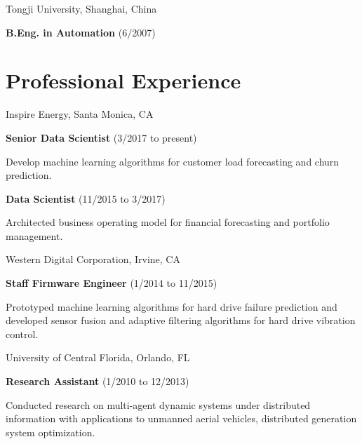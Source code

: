 \documentclass[margin,line]{res}
\newenvironment{list1}{
  \begin{list}{\ding{113}}{%
      \setlength{\itemsep}{0in}
      \setlength{\parsep}{0in} \setlength{\parskip}{0in}
      \setlength{\topsep}{0in} \setlength{\partopsep}{0in} 
      \setlength{\leftmargin}{0.17in}}}{\end{list}}
\begin{document}
\begin{resume}
\begin{list1}
\item[] Tongji University, Shanghai, China
\begin{list1}
\item[] \textbf{B.Eng. in Automation} (6/2007)
\end{list1}
\end{list1}


\section{\sc Professional Experience}
\begin{list1}

\item[] Inspire Energy, Santa Monica, CA
\vspace*{.05in}
\begin{list1}
\item[] \textbf{Senior Data Scientist} (3/2017 to present)
\item[] Develop machine learning algorithms for customer load forecasting and churn prediction.
\item[] \textbf{Data Scientist} (11/2015 to 3/2017)
\item[] Architected business operating model for financial forecasting and portfolio management.
\vspace*{.1in}
\end{list1}

\item[] Western Digital Corporation, Irvine, CA
\vspace*{.05in}
\begin{list1}
\item[] \textbf{Staff Firmware Engineer} (1/2014 to 11/2015)
\item[] Prototyped machine learning algorithms for hard drive failure prediction and developed sensor fusion and adaptive filtering algorithms for hard drive vibration control.
\vspace*{.1in}
\end{list1}

\item[] University of Central Florida, Orlando, FL
\vspace*{.05in}
\begin{list1}
\item[] \textbf{Research Assistant} (1/2010 to 12/2013)
\item[] Conducted research on multi-agent dynamic systems under distributed information with applications to unmanned aerial vehicles, distributed generation system optimization.
\vspace*{.1in}
\end{list1}


\end{list1}
\end{resume}
\end{document}
